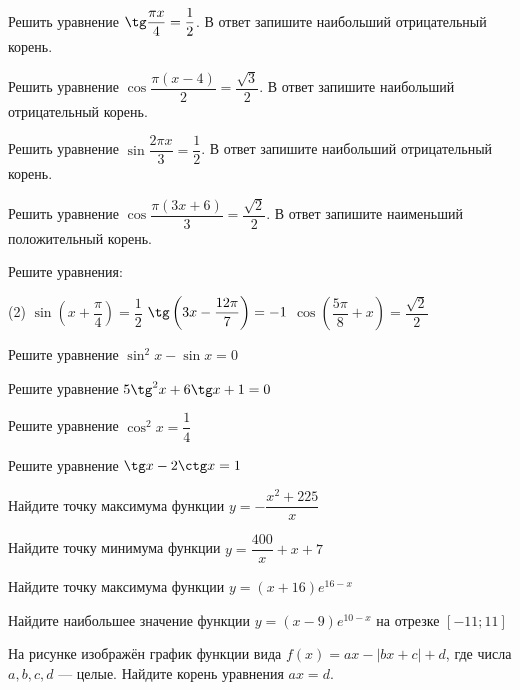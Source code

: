 \begin{class}[number=4]
	\begin{listofex}
		\item Решить уравнение \( \tg\dfrac{\pi x}{4}=\dfrac{1}{2} \). В ответ запишите наибольший отрицательный корень.
		\item Решить уравнение \( \cos\dfrac{\pi(x-4)}{2}=\dfrac{\sqrt{3}}{2} \). В ответ запишите наибольший отрицательный корень.
		\item Решить уравнение \( \sin\dfrac{2\pi x}{3}=\dfrac{1}{2} \). В ответ запишите наибольший отрицательный корень.
		\item Решить уравнение \( \cos\dfrac{\pi(3x+6)}{3}=\dfrac{\sqrt{2}}{2} \). В ответ запишите наименьший положительный корень.
		\item Решите уравнения:
		\begin{tasks}(2)
			\task \( \sin \left( x+\dfrac{\pi}{4} \right) = \dfrac{1}{2} \)
			\task \( \tg \left( 3x-\dfrac{12\pi}{7} \right) = -1 \)
			\task \( \cos \left( \dfrac{5\pi}{8}+x \right) = \dfrac{\sqrt{2}}{2} \)
		\end{tasks}
		\item Решите уравнение \( \sin^2x-\sin x=0 \)
		\item Решите уравнение \( 5\tg^2x+6\tg x+1=0 \)
		\item Решите уравнение \( \cos^2x=\dfrac{1}{4} \)
		\item  Решите уравнение \( \tg x-2\ctg x=1 \)
		\item Найдите точку максимума функции \( y=-\dfrac{x^2+225}{x} \)
		\item Найдите точку минимума функции \( y=\dfrac{400}{x}+x+7 \)
		\item Найдите точку максимума функции \( y=(x+16)e^{16-x} \)
		\item Найдите наибольшее значение функции \( y=(x-9)e^{10-x} \) на отрезке \( [-11;11] \)
		\item
		\begin{minipage}[t]{0.43\textwidth}
			На рисунке изображён график функции вида \(f(x)=ax-|bx+c|+d\), где числа \(a, b, c, d\) --- целые. Найдите корень уравнения \(ax=d\).
		\end{minipage}
		\begin{minipage}[c]{0.1\textwidth}

\end{minipage}
\end{listofex}
\end{class}
